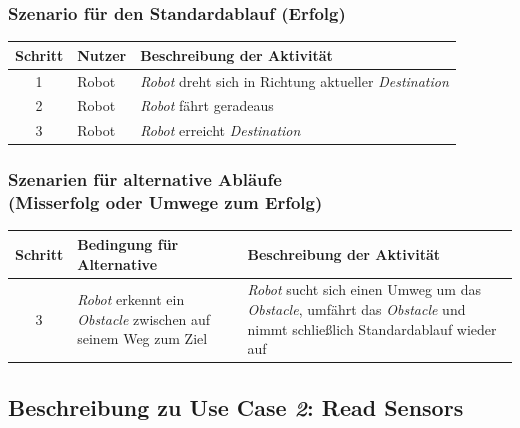 \documentclass[includeheaders]{scrartcl}
\begin{document}
			\subsubsection*{Szenario für den Standardablauf (Erfolg)}

			\begin{table}[H]
				\centering
				\begin{tabularx}{\textwidth}{@{}cp{2cm}X@{}}
				\toprule
				Schritt & Nutzer & Beschreibung der Aktivität \\ \midrule
				1 & Robot & \emph{Robot} dreht sich in Richtung aktueller \emph{Destination} \\
				2 & Robot & \emph{Robot} fährt geradeaus \\
				3 & Robot & \emph{Robot} erreicht \emph{Destination} \\
				\bottomrule
				\end{tabularx}
			\end{table}

			\subsubsection*{Szenarien für alternative Abläufe\\ (Misserfolg oder Umwege zum Erfolg)}

			\begin{table}[H]
				\centering
				\begin{tabularx}{\textwidth}{@{}cp{6cm}X@{}}
				\toprule
				Schritt & Bedingung für Alternative & Beschreibung der Aktivität \\ \midrule
				3 & \emph{Robot} erkennt ein \emph{Obstacle} zwischen auf seinem Weg zum Ziel & \emph{Robot} sucht sich einen Umweg um das \emph{Obstacle}, umfährt das \emph{Obstacle} und nimmt schließlich Standardablauf wieder auf \\
				\bottomrule
				\end{tabularx}
			\end{table}


		\subsection{Beschreibung zu Use Case \emph{2}: Read Sensors}
\end{document}

